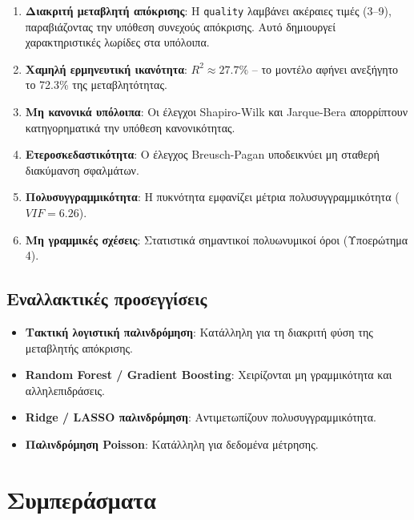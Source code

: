 \documentclass[12pt,a4paper]{article}
\begin{document}
\begin{enumerate}[nosep]
    \item \textbf{Διακριτή μεταβλητή απόκρισης}: Η \texttt{quality} λαμβάνει ακέραιες τιμές (3--9), παραβιάζοντας την υπόθεση συνεχούς απόκρισης. Αυτό δημιουργεί χαρακτηριστικές λωρίδες στα υπόλοιπα.

    \item \textbf{Χαμηλή ερμηνευτική ικανότητα}: $R^2 \approx 27.7\%$ -- το μοντέλο αφήνει ανεξήγητο το 72.3\% της μεταβλητότητας.

    \item \textbf{Μη κανονικά υπόλοιπα}: Οι έλεγχοι Shapiro-Wilk και Jarque-Bera απορρίπτουν κατηγορηματικά την υπόθεση κανονικότητας.

    \item \textbf{Ετεροσκεδαστικότητα}: Ο έλεγχος Breusch-Pagan υποδεικνύει μη σταθερή διακύμανση σφαλμάτων.

    \item \textbf{Πολυσυγγραμμικότητα}: Η πυκνότητα εμφανίζει μέτρια πολυσυγγραμμικότητα ($VIF = 6.26$).

    \item \textbf{Μη γραμμικές σχέσεις}: Στατιστικά σημαντικοί πολυωνυμικοί όροι (Υποερώτημα 4).
\end{enumerate}

\subsection{Εναλλακτικές προσεγγίσεις}

\begin{itemize}[nosep]
    \item \textbf{Τακτική λογιστική παλινδρόμηση}: Κατάλληλη για τη διακριτή φύση της μεταβλητής απόκρισης.
    \item \textbf{Random Forest / Gradient Boosting}: Χειρίζονται μη γραμμικότητα και αλληλεπιδράσεις.
    \item \textbf{Ridge / LASSO παλινδρόμηση}: Αντιμετωπίζουν πολυσυγγραμμικότητα.
    \item \textbf{Παλινδρόμηση Poisson}: Κατάλληλη για δεδομένα μέτρησης.
\end{itemize}

\section{Συμπεράσματα}
\end{document}
